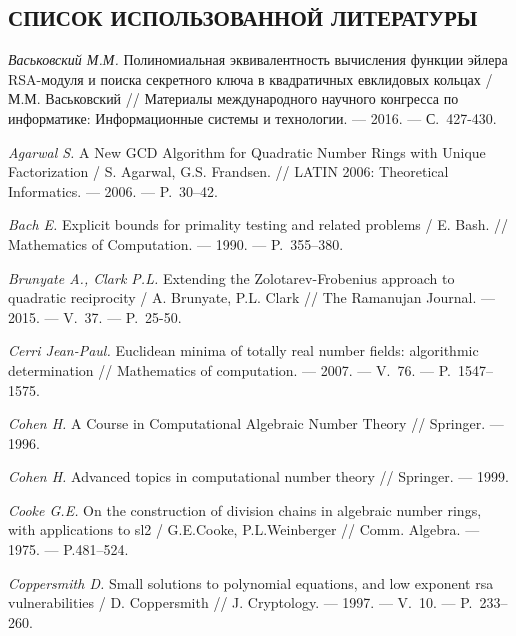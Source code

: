\newpage
\begin{center}
    \section*{СПИСОК ИСПОЛЬЗОВАННОЙ ЛИТЕРАТУРЫ}
\end{center}

\begin{thebibliography}{99}
\vspace{-12pt}

\textit{Васьковский М.М.} Полиномиальная эквивалентность вычисления функции эйлера RSA-модуля и поиска секретного ключа в квадратичных евклидовых кольцах / М.М. Васьковский // Материалы международного научного конгресса по информатике: Информационные системы и технологии. --- 2016. --- С.~427-430.

\textit{Agarwal S.} A New GCD Algorithm for Quadratic Number Rings with Unique Factorization / S. Agarwal, G.S. Frandsen. // LATIN 2006: Theoretical Informatics. --- 2006. --- P.~30--42.

\textit{Bach E.} Explicit bounds for primality testing and related problems / E. Bash. // Mathematics of Computation. --- 1990. --- P.~355--380.

\textit{Brunyate A., Clark P.L.} Extending the Zolotarev-Frobenius approach to quadratic reciprocity / A. Brunyate, P.L. Clark // The Ramanujan Journal. --- 2015. --- V.~37. --- P.~25-50.

\textit{Cerri Jean-Paul.} Euclidean minima of totally real number fields: algorithmic determination // Mathematics of computation. --- 2007. --- V.~76. --- {P.}~1547--1575.

\textit{Cohen H.} A Course in Computational Algebraic Number Theory // Springer. --- 1996.

\textit{Cohen H.} Advanced topics in computational number theory // Springer. --- 1999.

\textit{Cooke G.E.} On the construction of division chains in algebraic number rings, with applications to sl2 / G.E.Cooke, P.L.Weinberger // Comm. Algebra. --- 1975. --- P.481–524.

\textit{Coppersmith D.} Small solutions to polynomial equations, and low exponent rsa vulnerabilities / D. Coppersmith // J. Cryptology. --- 1997. --- V.~10. --- P.~233--260.


\end{thebibliography}
